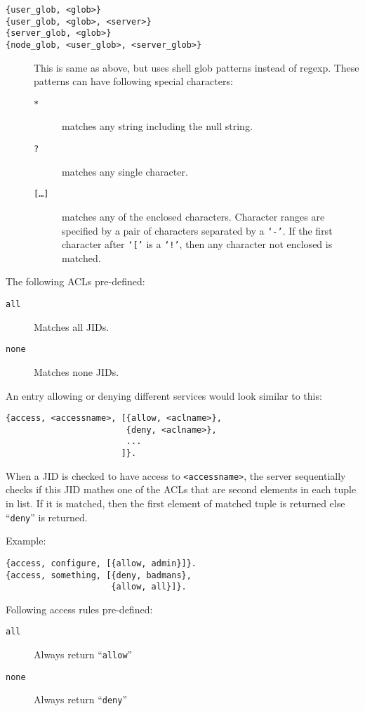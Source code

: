 \documentclass[10pt]{article}
\begin{document}
\begin{description}
\item[\texttt{\{user\_glob, <glob>\}}]
\item[\texttt{\{user\_glob, <glob>, <server>\}}]
\item[\texttt{\{server\_glob, <glob>\}}]
\item[\texttt{\{node\_glob, <user\_glob>, <server\_glob>\}}] This is same as
  above, but uses shell glob patterns instead of regexp.  These patterns can
  have following special characters:
  \begin{description}
  \item[\texttt{*}] matches any string including the null string.
  \item[\texttt{?}] matches any single character.
  \item[\texttt{[\ldots{}]}] matches any of the enclosed characters.  Character
    ranges are specified by a pair of characters separated by a \texttt{`-'}.
    If the first character after \texttt{`['} is a \texttt{`!'}, then any
    character not enclosed is matched.
  \end{description}
\end{description}

The following ACLs pre-defined:
\begin{description}
\item[\texttt{all}] Matches all JIDs.
\item[\texttt{none}] Matches none JIDs.
\end{description}

An entry allowing or denying different services would look similar to this:
\begin{verbatim}
{access, <accessname>, [{allow, <aclname>},
                        {deny, <aclname>},
                        ...
                       ]}.
\end{verbatim}
When a JID is checked to have access to \texttt{<accessname>}, the server
sequentially checks if this JID mathes one of the ACLs that are second elements
in each tuple in list.  If it is matched, then the first element of matched
tuple is returned else ``\texttt{deny}'' is returned.

Example:
\begin{verbatim}
{access, configure, [{allow, admin}]}.
{access, something, [{deny, badmans},
                     {allow, all}]}.
\end{verbatim}

Following access rules pre-defined:
\begin{description}
\item[\texttt{all}] Always return ``\texttt{allow}''
\item[\texttt{none}] Always return ``\texttt{deny}''
\end{description}
\end{document}

